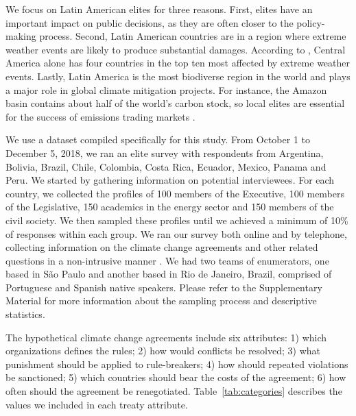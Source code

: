 \documentclass[a4paper,12pt]{article}
\begin{document}
We focus on Latin American elites for three reasons. First, elites have an important impact on public decisions, as they are often closer to the policy-making process. Second, Latin American countries are in a region where extreme weather events are likely to produce substantial damages. According to \citet{eckstein2017global}, Central America alone has four countries in the top ten most affected by extreme weather events. Lastly, Latin America is the most biodiverse region in the world and plays a major role in global climate mitigation projects. For instance, the Amazon basin contains about half of the world's carbon stock, so local elites are essential for the success of emissions trading markets \citep{benitez2006site, yang2018post}. 

We use a dataset compiled specifically for this study. From October 1 to December 5, 2018, we ran an elite survey with respondents from Argentina, Bolivia, Brazil, Chile, Colombia, Costa Rica, Ecuador, Mexico, Panama and Peru. We started by gathering information on potential interviewees. For each country, we collected the profiles of 100 members of the Executive, 100 members of the Legislative, 150 academics in the energy sector and 150 members of the civil society. We then sampled these profiles until we achieved a minimum of 10\% of responses within each group. We ran our survey both online and by telephone, collecting information on the climate change agreements and other related questions in a non-intrusive manner \citep{loewen2010help}. We had two teams of enumerators, one based in S\~{a}o Paulo and another based in Rio de Janeiro, Brazil, comprised of Portuguese and Spanish native speakers. Please refer to the Supplementary Material for more information about the sampling process and descriptive statistics.

The hypothetical climate change agreements include six attributes: 1) which organizations defines the rules; 2) how would conflicts be resolved; 3) what punishment should be applied to rule-breakers; 4) how should repeated violations be sanctioned; 5) which countries should bear the costs of the agreement; 6) how often should the agreement be renegotiated. Table~\ref{tab:categories} describes the values we included in each treaty attribute. 
\end{document}
